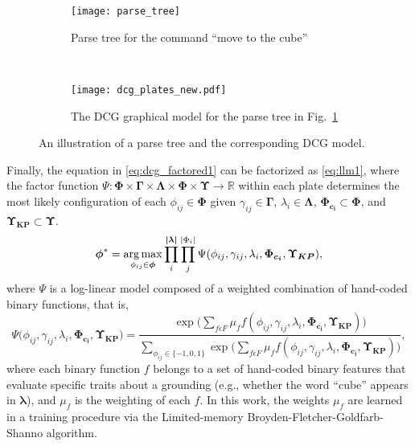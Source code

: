 \begin{figure}[h!]
\centering
\begin{subfigure}[b]{0.38\columnwidth}
\texttt{[image: parse\_tree]}
\caption{Parse tree for the command ``move to the cube''}
\label{fig:parse_tree}
\end{subfigure}
~
\begin{subfigure}[b]{0.58\columnwidth}
\centering
\texttt{[image: dcg\_plates\_new.pdf]}
\caption{The DCG graphical model for the parse tree in Fig.~\ref{fig:parse_tree}}
\label{fig:dcg_plates}
\end{subfigure}
\caption{An illustration of a parse tree and the corresponding DCG model.}
\end{figure}

Finally, the equation in \eqref{eq:dcg_factored1} can be factorized as \eqref{eq:llm1}, where the factor function $\Psi : \boldsymbol\Phi \times \boldsymbol\Gamma \times \boldsymbol\Lambda \times \boldsymbol\Phi \times \boldsymbol\Upsilon \rightarrow
 \mathbb{R}$ within each plate determines the most likely configuration of each $\phi_{ij} \in \boldsymbol\Phi$ given $\gamma_{ij} \in \boldsymbol\Gamma$, $\lambda_i \in \boldsymbol\Lambda$, $\boldsymbol{\Phi_{c_{i}}} \subset \boldsymbol\Phi$, and $\boldsymbol{\Upsilon_{KP}} \subset \boldsymbol\Upsilon$. %
\begin{equation}
\boldsymbol{\phi}^* = \operatorname*{\arg\max}_{\phi_{ij} \in \boldsymbol{\phi}} \prod_{i}^{\boldsymbol{|\lambda|}} \prod_{j}^{|\Phi_i|} \Psi(\phi_{ij},\gamma_{ij},\lambda_i,\boldsymbol{\Phi_{c_{i}}},\boldsymbol{\Upsilon_{KP}}),
\label{eq:llm1}
\end{equation}
where $\Psi$ is a log-linear model composed of a weighted combination of hand-coded binary functions, that is,
\begin{equation}
\Psi(\phi_{ij},\gamma_{ij},\lambda_i,\boldsymbol{\Phi_{c_{i}}},\boldsymbol{\Upsilon_{KP})} = \frac {\exp \Big( \sum\limits_{f \epsilon F} \mu_f f(\phi_{ij},\gamma_{ij},\lambda_i,\boldsymbol{\Phi_{c_{i}}},\boldsymbol{\Upsilon_{KP}}) \Big)}{\sum\limits_{\phi_{ij} \in \{-1,0,1\}}\exp \Big( \sum\limits_{f \epsilon F} \mu_f f(\phi_{ij},\gamma_{ij},\lambda_i,\boldsymbol{\Phi_{c_{i}}},\boldsymbol{\Upsilon_{KP}}) \Big)},
\label{eq:llm2}
\end{equation}
where each binary function $f$ belongs to a set of hand-coded binary features that evaluate specific traits about a grounding (e.g., whether the word ``cube'' appears in $\boldsymbol{\lambda}$), and $\mu_f$ is the weighting of each $f$. In this work,
the weights $\mu_f$ are learned in a training procedure via the Limited-memory Broyden-Fletcher-Goldfarb-Shanno algorithm.%